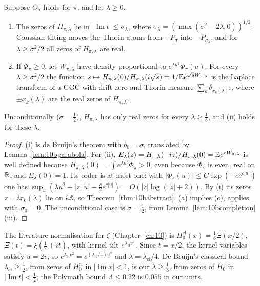 \begin{theorem}\label{thm:10btilting}
Suppose $\Theta_\sigma$ holds for $\pi$, and let $\lambda\ge0$.
\begin{enumerate}
\item[(i)] The zeros of $H_{\pi,\lambda}$ lie in $|\operatorname{Im}t|\le\sigma_\lambda$, where $\sigma_\lambda = (\max(\sigma^2-2\lambda,0))^{1/2}$; Gaussian tilting moves the Thorin atoms from $-P_\sigma$ into $-P_{\sigma_\lambda}$, and for $\lambda\ge\sigma^2/2$ all zeros of $H_{\pi,\lambda}$ are real.
\item[(ii)] If $\Phi_\pi\ge0$, let $W_{\pi,\lambda}$ have density proportional to $e^{\lambda u^2}\Phi_\pi(u)$. For every $\lambda\ge\sigma^2/2$ the function $s\mapsto H_{\pi,\lambda}(0)/H_{\pi,\lambda}(i\sqrt s) = 1/\mathbb{E} e^{\sqrt sW_{\pi,\lambda}}$ is the Laplace transform of a GGC with drift zero and Thorin measure $\sum_k\delta_{x_k(\lambda)^2}$, where $\pm x_k(\lambda)$ are the real zeros of $H_{\pi,\lambda}$.
\end{enumerate}
Unconditionally ($\sigma=\frac12$), $H_{\pi,\lambda}$ has only real zeros for every $\lambda\ge\frac18$, and (ii) holds for these $\lambda$.
\end{theorem}

\begin{proof}
(i) is de Bruijn's theorem with $b_0 = \sigma$, translated by Lemma~\ref{lem:10bparabola}. For (ii), $E_\lambda(z) = H_{\pi,\lambda}(-iz)/H_{\pi,\lambda}(0) = \mathbb{E} e^{zW_{\pi,\lambda}}$ is well defined because $H_{\pi,\lambda}(0) = \int e^{\lambda u^2}\Phi_\pi>0$, even because $\Phi_\pi$ is even, real on $\mathbb{R}$, and $E_\lambda(0)=1$. Its order is at most one: with $|\Phi_\pi(u)|\le C\exp(-ce^{c|u|})$ one has $\sup_u(\lambda u^2+|z||u|-\frac c2e^{c|u|}) = O(|z|\log(|z|+2))$. By (i) its zeros $z = ix_k(\lambda)$ lie on $i\mathbb{R}$, so Theorem~\ref{thm:10babstract}, (a) implies (c), applies with $\sigma_0=0$. The unconditional case is $\sigma=\frac12$, from Lemma~\ref{lem:10bcompletion}(iii).
\end{proof}

\begin{remark}
The literature normalisation for $\zeta$ (Chapter~\ref{ch:10}) is $H^{\mathrm{cl}}_0(x) = \frac18\Xi(x/2)$, $\Xi(t) = \xi(\frac12+it)$, with kernel tilt $e^{\lambda_{\mathrm{cl}}v^2}$. Since $t = x/2$, the kernel variables satisfy $u = 2v$, so $e^{\lambda_{\mathrm{cl}}v^2} = e^{(\lambda_{\mathrm{cl}}/4)u^2}$ and $\lambda = \lambda_{\mathrm{cl}}/4$. De Bruijn's classical bound $\lambda_{\mathrm{cl}}\ge\frac12$, from zeros of $H^{\mathrm{cl}}_0$ in $|\operatorname{Im}x|<1$, is our $\lambda\ge\frac18$, from zeros of $H_0$ in $|\operatorname{Im}t|<\frac12$; the Polymath bound $\Lambda\le0.22$ \cite{polymath2019} is $0.055$ in our units.
\end{remark}

